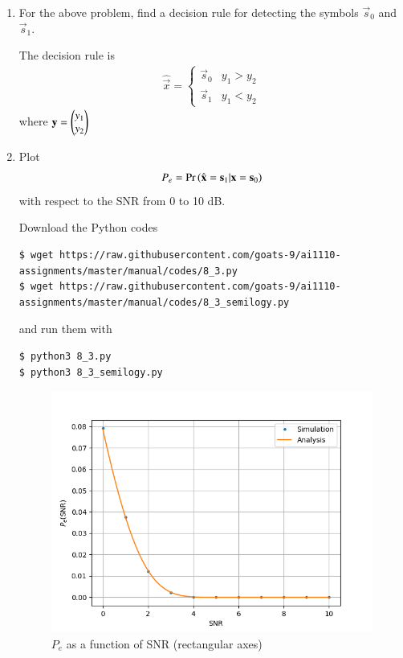 \documentclass[journal,12pt,twocolumn]{IEEEtran}
\renewcommand\thesection{\arabic{section}}
\begin{document}
\begin{enumerate}[label=\thesection.\arabic*
,ref=\thesection.\theenumi]
\item For the above problem, find a decision rule for detecting the symbols $\vec{s}_0$ and $\vec{s}_1$.

\solution
The decision rule is 
\begin{align}
	\hat{\vec{x}} = 
	\begin{cases}
		\vec{s}_0 & y_1 > y_2 \\
		\vec{s}_1 & y_1 < y_2
	\end{cases}
\end{align}
where $\mathbf{y} = \begin{pmatrix}y_1 \\ y_2\end{pmatrix}$
\item Plot 
	\begin{align}
		P_e = \Pr\left(\hat{\mathbf{x}} = \mathbf{s}_1 | \mathbf{x} = \mathbf{s}_0\right)
	\end{align}
with respect to the SNR from 0 to 10 dB.

\solution
Download the Python codes
\begin{lstlisting}
$ wget https://raw.githubusercontent.com/goats-9/ai1110-assignments/master/manual/codes/8_3.py
$ wget https://raw.githubusercontent.com/goats-9/ai1110-assignments/master/manual/codes/8_3_semilogy.py
\end{lstlisting}
and run them with
\begin{lstlisting}
$ python3 8_3.py
$ python3 8_3_semilogy.py
\end{lstlisting}

\begin{figure}[!htb]
	\includegraphics[width=\columnwidth]{figs/8_3.png}
	\caption{$P_e$ as a function of SNR (rectangular axes)}
	\label{fig:p-e-rect}
\end{figure}


\end{enumerate}
\end{document}
